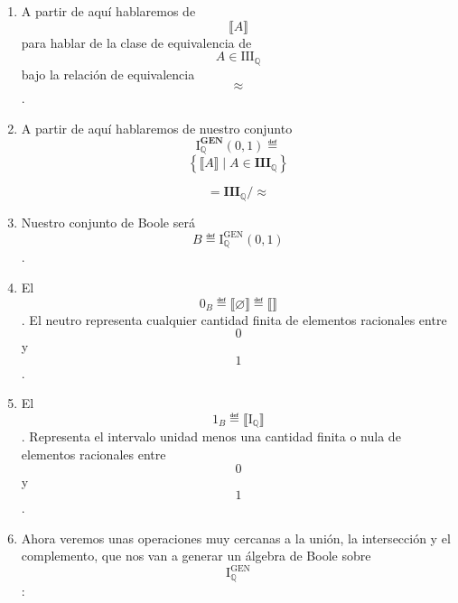 \begin{enumerate}
\begin{enumerate}
\begin{enumerate}
\begin{enumerate}
        \begin{enumerate}
        \def\labelenumv{\arabic{enumv}.}
        \tightlist
        \item
          \[\#{\left( {A\bigtriangleup B} \right) = n_{1} \in {\overset{\sim}{\mathbb{N}} \land \#}}{\left( {B\bigtriangleup C} \right) = n_{2} \in {\mathbb{N}}_{0}}.\Rightarrow.\#{\left( {A\bigtriangleup C} \right) \leq {n_{1} + n_{2}} \in {\mathbb{N}}_{0}}\].
          Y queda de\-mostrada la propiedad transitiva.
        \end{enumerate}
      \end{enumerate}
    \item
      A partir de aquí hablaremos de \[⟦A⟧\]para hablar de la clase de
      equivalencia de \[A \in \mathbf{\mathrm{III}}_{\mathbb{Q}}\]bajo
      la relación de equivalencia \[\approx\].
    \item
      A partir de aquí hablaremos de nuestro conjunto
      \[\mathbf{\mathrm{I}}_{\mathbb{Q}}^{\mathbf{GEN}}(0,1) ≝ {}\]
      \[\left\{ {{⟦A⟧} \mid {A \in \mathbf{III}_{\mathbb{Q}}}} \right\}\]

      \[{} = {\mathbf{III}_{\mathbb{Q}}/ \approx}\]
    \item
      Nuestro conjunto de Boole será
      \[B ≝ {\mathbf{\mathrm{I}}_{\mathbb{Q}}^{\mathbf{\mathrm{GEN}}}(0,1)}\].
    \item
      El \[0_{B}≝{⟦\varnothing ⟧}≝{⟦⟧}\]. El neutro representa cualquier
      cantidad finita de elementos racionales entre \[0\] y \[1\].
    \item
      El \[1_{B}≝{⟦\mathbf{\mathrm{I}}_{\mathbb{Q}}⟧}\]. Representa el
      intervalo unidad menos una cantidad finita o nula de elementos
      racionales entre \[0\] y \[1\].
    \item
      Ahora veremos unas operaciones muy cercanas a la unión, la
      intersección y el com\-plemento, que nos van a generar un álgebra
      de Boole sobre
      \[\mathbf{\mathrm{I}}_{\mathbb{Q}}^{\mathbf{\mathrm{GEN}}}\]:


\end{enumerate}
\end{enumerate}
\end{enumerate}
